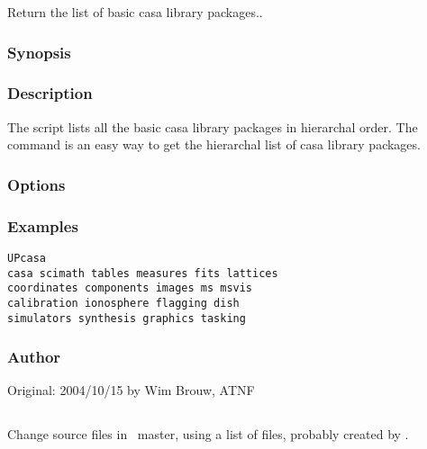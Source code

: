 Return the list of basic casa library packages..

\subsubsection*{Synopsis}

\begin{synopsis}
\end{synopsis}

\subsubsection*{Description}

\noindent
The  script lists all the basic casa library packages in
hierarchal order.
The command is an easy way to get the hierarchal list of casa
library packages.

\subsubsection*{Options}

\subsubsection*{Examples}

\begin{verbatim}
UPcasa
casa scimath tables measures fits lattices 
coordinates components images ms msvis 
calibration ionosphere flagging dish 
simulators synthesis graphics tasking
\end{verbatim}

\subsubsection*{Author}

Original: 2004/10/15 by Wim Brouw, ATNF


\newpage

\subsection{}
\label{UPchange}

Change source files in \aipspp\ master, using a list of files, probably
created by .

